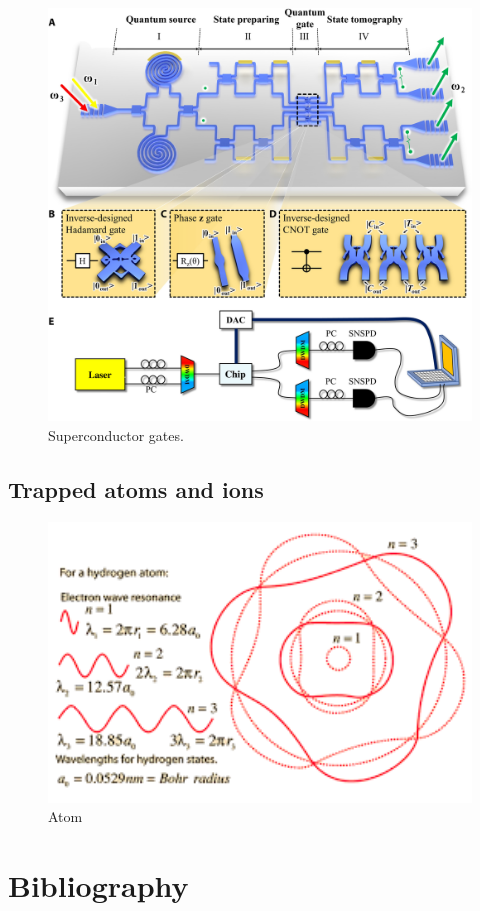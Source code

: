 \documentclass[oneside, letter, 12pt]{book}
\begin{document}
\begin{figure}[h]
\includegraphics[width=12cm]{pic/superGates.jpg}
\caption{Superconductor gates.}
\label{superGates}
\end{figure}

\section{Trapped atoms and ions}

\begin{figure}[h]
\includegraphics[width=12cm]{pic/h-atom.png}
\caption{Atom}
\label{Atom}
\end{figure}


\chapter*{Bibliography}

   

\printindex
\end{document}
